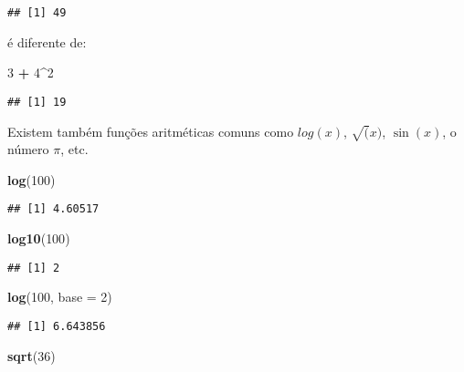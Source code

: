 \documentclass[
]{book}
\newenvironment{Shaded}{\begin{snugshade}}{\end{snugshade}}
\newcommand{\DataTypeTok}[1]{\textcolor[rgb]{0.13,0.29,0.53}{#1}}
\newcommand{\DecValTok}[1]{\textcolor[rgb]{0.00,0.00,0.81}{#1}}
\newcommand{\KeywordTok}[1]{\textcolor[rgb]{0.13,0.29,0.53}{\textbf{#1}}}
\newcommand{\NormalTok}[1]{#1}
\newcommand{\OperatorTok}[1]{\textcolor[rgb]{0.81,0.36,0.00}{\textbf{#1}}}
\newcommand{\StringTok}[1]{\textcolor[rgb]{0.31,0.60,0.02}{#1}}
\begin{document}
\begin{verbatim}
## [1] 49
\end{verbatim}

é diferente de:

\begin{Shaded}
\begin{Highlighting}[]
\DecValTok{3} \OperatorTok{+}\StringTok{ }\DecValTok{4}\OperatorTok{^}\DecValTok{2}
\end{Highlighting}
\end{Shaded}

\begin{verbatim}
## [1] 19
\end{verbatim}

Existem também funções aritméticas comuns como \(log(x)\), \(\sqrt(x)\), \(\sin(x)\), o número \(\pi\), etc.

\begin{Shaded}
\begin{Highlighting}[]
\KeywordTok{log}\NormalTok{(}\DecValTok{100}\NormalTok{)}
\end{Highlighting}
\end{Shaded}

\begin{verbatim}
## [1] 4.60517
\end{verbatim}

\begin{Shaded}
\begin{Highlighting}[]
\KeywordTok{log10}\NormalTok{(}\DecValTok{100}\NormalTok{)}
\end{Highlighting}
\end{Shaded}

\begin{verbatim}
## [1] 2
\end{verbatim}

\begin{Shaded}
\begin{Highlighting}[]
\KeywordTok{log}\NormalTok{(}\DecValTok{100}\NormalTok{, }\DataTypeTok{base =} \DecValTok{2}\NormalTok{)}
\end{Highlighting}
\end{Shaded}

\begin{verbatim}
## [1] 6.643856
\end{verbatim}

\begin{Shaded}
\begin{Highlighting}[]
\KeywordTok{sqrt}\NormalTok{(}\DecValTok{36}\NormalTok{)}
\end{Highlighting}
\end{Shaded}
\end{document}
